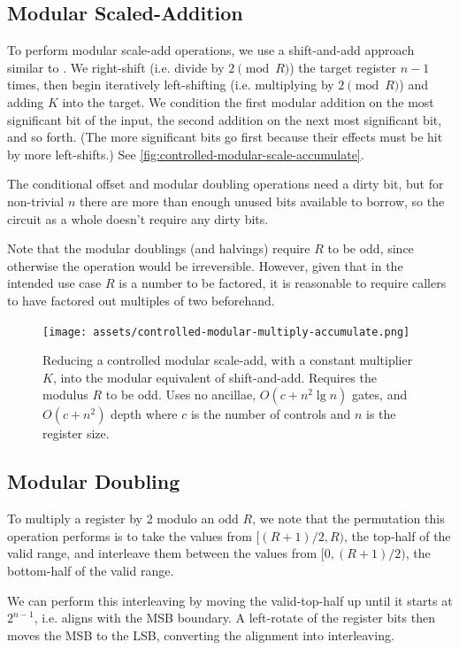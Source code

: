 \documentclass[twocolumn,longbibliography]{quantumarticle-customized}
\begin{document}
\subsection{Modular Scaled-Addition}

To perform modular scale-add operations, we use a shift-and-add approach similar to \cite{beauregard2003}.
We right-shift (i.e. divide by $2 {\pmod R}$) the target register $n-1$ times, then begin iteratively left-shifting (i.e. multiplying by $2 {\pmod R}$) and adding $K$ into the target.
We condition the first modular addition on the most significant bit of the input, the second addition on the next most significant bit, and so forth.
(The more significant bits go first because their effects must be hit by more left-shifts.)
See \autoref{fig:controlled-modular-scale-accumulate}.

The conditional offset and modular doubling operations need a dirty bit, but for non-trivial $n$ there are more than enough unused bits available to borrow, so the circuit as a whole doesn't require any dirty bits.

Note that the modular doublings (and halvings) require $R$ to be odd, since otherwise the operation would be irreversible.
However, given that in the intended use case $R$ is a number to be factored, it is reasonable to require callers to have factored out multiples of two beforehand.

\begin{figure}
  \centering
  \texttt{[image: assets/controlled-modular-multiply-accumulate.png]}
  \caption{
    Reducing a controlled modular scale-add, with a constant multiplier $K$, into the modular equivalent of shift-and-add.
    Requires the modulus $R$ to be odd.
    Uses no ancillae, $O(c + n^2 \lg n)$ gates, and $O(c + n^2)$ depth where $c$ is the number of controls and $n$ is the register size.
  }
  \label{fig:controlled-modular-scale-accumulate}
\end{figure}


\subsection{Modular Doubling}

To multiply a register by 2 modulo an odd $R$, we note that the permutation this operation performs is to take the values from $[(R+1)/2, R)$, the top-half of the valid range, and interleave them between the values from $[0, (R+1)/2)$, the bottom-half of the valid range.

We can perform this interleaving by moving the valid-top-half up until it starts at $2^{n-1}$, i.e. aligns with the MSB boundary.
A left-rotate of the register bits then moves the MSB to the LSB, converting the alignment into interleaving.
\end{document}
